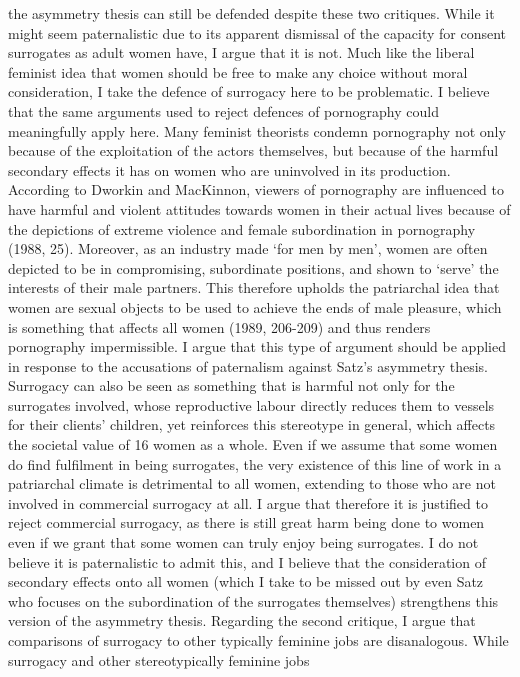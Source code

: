 the asymmetry thesis can still be defended despite these two critiques.
While it might seem paternalistic due to its apparent dismissal of the
capacity for consent surrogates as adult women have, I argue that it is
not. Much like the liberal feminist idea that women should be free to
make any choice without moral consideration, I take the defence of
surrogacy here to be problematic. I believe that the same arguments used
to reject defences of pornography could meaningfully apply here. Many
feminist theorists condemn pornography not only because of the
exploitation of the actors themselves, but because of the harmful
secondary effects it has on women who are uninvolved in its production.
According to Dworkin and MacKinnon, viewers of pornography are
influenced to have harmful and violent attitudes towards women in their
actual lives because of the depictions of extreme violence and female
subordination in pornography (1988, 25). Moreover, as an industry made
`for men by men', women are often depicted to be in compromising,
subordinate positions, and shown to `serve' the interests of their male
partners. This therefore upholds the patriarchal idea that women are
sexual objects to be used to achieve the ends of male pleasure, which is
something that affects all women (1989, 206-209) and thus renders
pornography impermissible. I argue that this type of argument should be
applied in response to the accusations of paternalism against Satz's
asymmetry thesis. Surrogacy can also be seen as something that is
harmful not only for the surrogates involved, whose reproductive labour
directly reduces them to vessels for their clients' children, yet
reinforces this stereotype in general, which affects the societal value
of 16 women as a whole. Even if we assume that some women do find
fulfilment in being surrogates, the very existence of this line of work
in a patriarchal climate is detrimental to all women, extending to those
who are not involved in commercial surrogacy at all. I argue that
therefore it is justified to reject commercial surrogacy, as there is
still great harm being done to women even if we grant that some women
can truly enjoy being surrogates. I do not believe it is paternalistic
to admit this, and I believe that the consideration of secondary effects
onto all women (which I take to be missed out by even Satz who focuses
on the subordination of the surrogates themselves) strengthens this
version of the asymmetry thesis. Regarding the second critique, I argue
that comparisons of surrogacy to other typically feminine jobs are
disanalogous. While surrogacy and other stereotypically feminine jobs

